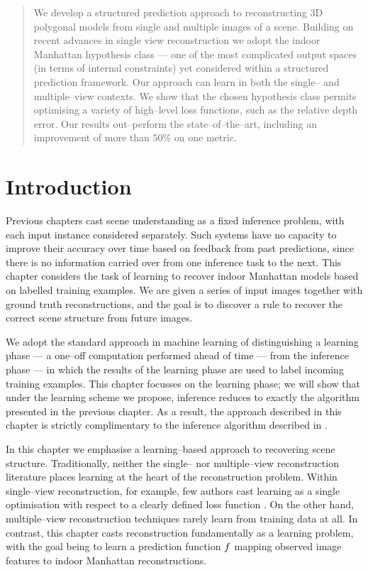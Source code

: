\begin{quote}
  We develop a structured prediction approach to reconstructing 3D
  polygonal models from single and multiple images of a
  scene. Building on recent advances in single view reconstruction we
  adopt the indoor Manhattan hypothesis class --- one of the most
  complicated output spaces (in terms of internal constraints) yet
  considered within a structured prediction framework. Our approach
  can learn in both the single-- and multiple--view contexts. We
  show that the chosen hypothesis class permits optimising a variety
  of high--level loss functions, such as the relative depth error. Our
  results out--perform the state--of--the--art, including an
  improvement of more than $50\%$ on one metric.\footnotemark
\end{quote}


\section{Introduction}
\label{sec:introduction}

Previous chapters cast scene understanding as a fixed inference
problem, with each input instance considered separately. Such systems
have no capacity to improve their accuracy over time based on feedback
from past predictions, since there is no information carried over from
one inference task to the next. This chapter considers the task of
learning to recover indoor Manhattan models based on labelled training
examples. We are given a series of input images together with ground
truth reconstructions, and the goal is to discover a rule to recover
the correct scene structure from future images.

We adopt the standard approach in machine learning of distinguishing a
learning phase --- a one--off computation performed ahead of time ---
from the inference phase --- in which the results of the learning
phase are used to label incoming training examples. This chapter
focusses on the learning phase; we will show that under the learning
scheme we propose, inference reduces to exactly the algorithm
presented in the previous chapter. As a result, the approach described
in this chapter is strictly complimentary to the inference algorithm
described in .

In this chapter we emphasise a learning--based approach to recovering
scene structure. Traditionally, neither the single-- nor
multiple--view reconstruction literature places learning at the heart
of the reconstruction problem. Within single--view reconstruction, for
example, few authors cast learning as a single optimisation with
respect to a clearly defined loss function
\cite{Hoiem05,Saxena09,Lee09,Flint11}. On the other hand,
multiple--view reconstruction techniques rarely learn from training
data at all. In contrast, this chapter casts reconstruction
fundamentally as a learning problem, with the goal being to learn a
prediction function $\Predictor$ mapping observed image features to
indoor Manhattan reconstructions.

